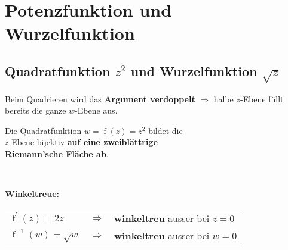 		\section{Potenzfunktion und Wurzelfunktion}
			\subsection{Quadratfunktion $z^2$ und Wurzelfunktion $\sqrt{z}$}
				Beim Quadrieren wird das \textbf{Argument verdoppelt} $\Rightarrow$ halbe $z$-Ebene füllt bereits die ganze $w$-Ebene aus.\\[3pt]
				
				\begin{minipage}[t]{0.5\textwidth}
					\begin{framed}
						Die Quadratfunktion $w = \operatorname{f}\left( z \right) = z^2$ bildet die\\[3pt]
						$z$-Ebene bijektiv \textbf{auf eine zweiblättrige\\[3pt] Riemann'sche Fläche ab}.
					\end{framed}
				\end{minipage}
				\begin{minipage}[t]{0.5\textwidth}
					
				\end{minipage}\\[3pt]
				\begin{minipage}[t]{0.2\textwidth}
					\textbf{Winkeltreue:}
				\end{minipage}
				\begin{minipage}[t]{0.5\textwidth}
					\begin{framed}
						\begin{tabular}{lll}
							$\operatorname{f}^{\prime}\left( z \right) = 2 z$ & $\Rightarrow$ & \textbf{winkeltreu} ausser bei $z = 0$\\[3pt]
							$\operatorname{f}^{-1}\left( w \right) = \sqrt{w}$ & $\Rightarrow$ & \textbf{winkeltreu} ausser bei $w = 0$\\[3pt]
						\end{tabular}
					\end{framed}
				\end{minipage}
				\begin{minipage}[t]{0.3\textwidth}
					
				\end{minipage}\\[3pt]
			
